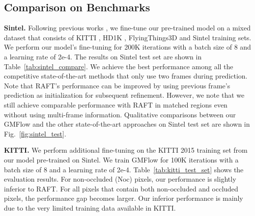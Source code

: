 \documentclass[10pt,twocolumn,letterpaper]{article}
\begin{document}
\subsection{Comparison on Benchmarks}
\label{sec:sintel_kitti}


{\bf Sintel.} Following previous works \cite{teed2020raft,xu2021high}, we fine-tune our pre-trained model on a mixed dataset that consists of KITTI \cite{menze2015object}, HD1K \cite{kondermann2016hci}, FlyingThings3D \cite{mayer2016large} and Sintel \cite{butler2012naturalistic} training sets. We perform our model's fine-tuning for 200K iterations with a batch size of 8 and a learning rate of 2e-4. The results on Sintel test set are shown in Table~\ref{tab:sintel_compare}. We achieve the best performance among all the competitive state-of-the-art methods that only use two frames during prediction. Note that RAFT's performance can be improved by using previous frame's prediction as initialization for subsequent refinement. However, we note that we still achieve comparable performance with RAFT in matched regions even without using multi-frame information. Qualitative comparisons between our GMFlow and the other state-of-the-art approaches on Sintel test set are shown in Fig.~\ref{fig:sintel_test}. 


{\bf KITTI.} We perform additional fine-tuning on the KITTI 2015 training set from our model pre-trained on Sintel. We train GMFlow for 100K iterations with a batch size of 8 and a learning rate of 2e-4. Table~\ref{tab:kitti_test_set} shows the evaluation results. For non-occluded (Noc) pixels, our performance is slightly inferior to RAFT. For all pixels that contain both non-occluded and occluded pixels, the performance gap becomes larger. Our inferior performance is mainly due to the very limited training data available in KITTI.
\end{document}
